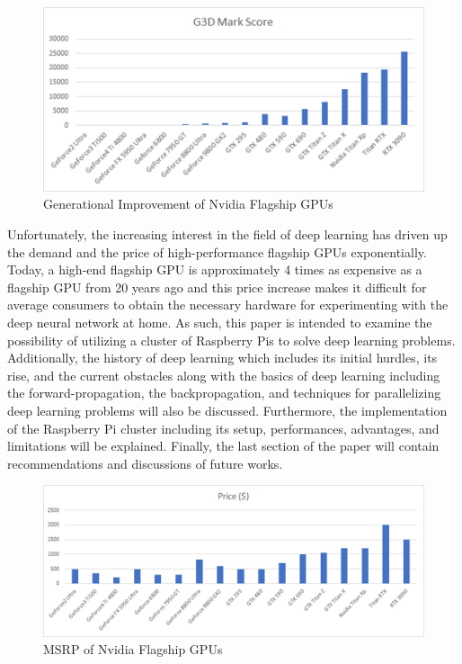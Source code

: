 \documentclass[conference]{IEEEtran}
\begin{document}
        \begin{figure}[!htb]
            \centering
            \captionsetup{justification=centering}
            \includegraphics[width=\linewidth]{GPU_Improvment.png}
            \caption{Generational Improvement of Nvidia Flagship GPUs}  
        \end{figure}
        
        Unfortunately, the increasing interest in the field of deep learning has driven up the demand and the price of high-performance flagship GPUs exponentially. Today, a high-end flagship GPU is approximately 4 times as expensive as a flagship GPU from 20 years ago \cite{passmark_software} and this price increase makes it difficult for average consumers to obtain the necessary hardware for experimenting with the deep neural network at home. As such, this paper is intended to examine the possibility of utilizing a cluster of Raspberry Pis to solve deep learning problems. Additionally, the history of deep learning which includes its initial hurdles, its rise, and the current obstacles along with the basics of deep learning including the forward-propagation, the backpropagation, and techniques for parallelizing deep learning problems will also be discussed. Furthermore, the implementation of the Raspberry Pi cluster including its setup, performances, advantages, and limitations will be explained. Finally, the last section of the paper will contain recommendations and discussions of future works.

        \begin{figure}[!htb]
            \centering
            \captionsetup{justification=centering}
            \includegraphics[width=\linewidth]{GPU_Price.png}
            \caption{MSRP of Nvidia Flagship GPUs}  
        \end{figure}
\end{document}

